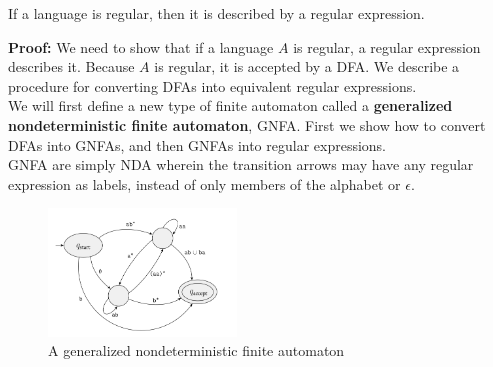 \begin{lemma}
    If a language is regular, then it is described by a regular expression.
\end{lemma}

\textbf{Proof:} We need to show that if a language $A$ is regular, a regular
expression describes it. Because $A$ is regular, it is accepted by a DFA. We
describe a procedure for converting DFAs into equivalent regular expressions.\\

We will first define a new type of finite automaton called a
\textbf{generalized nondeterministic finite automaton}, GNFA. First we show
how to convert DFAs into GNFAs, and then GNFAs into regular expressions.\\

GNFA are simply NDA wherein the transition arrows may have any regular
expression as labels, instead of only members of the alphabet or $\epsilon$.

\begin{figure}
    \begin{center}
        \includegraphics[width=5cm]{img/161.png}
        \caption{A generalized nondeterministic finite automaton}
    \end{center}
\end{figure}


